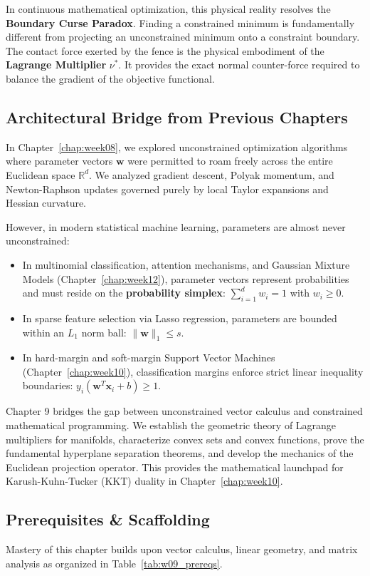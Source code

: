 In continuous mathematical optimization, this physical reality resolves the \textbf{Boundary Curse Paradox}. Finding a constrained minimum is fundamentally different from projecting an unconstrained minimum onto a constraint boundary. The contact force exerted by the fence is the physical embodiment of the \textbf{Lagrange Multiplier} $\nu^*$. It provides the exact normal counter-force required to balance the gradient of the objective functional.

\subsection{Architectural Bridge from Previous Chapters}
In Chapter~\ref{chap:week08}, we explored unconstrained optimization algorithms where parameter vectors $\mathbf{w}$ were permitted to roam freely across the entire Euclidean space $\mathbb{R}^d$. We analyzed gradient descent, Polyak momentum, and Newton-Raphson updates governed purely by local Taylor expansions and Hessian curvature.

However, in modern statistical machine learning, parameters are almost never unconstrained:
\begin{itemize}
    \item In multinomial classification, attention mechanisms, and Gaussian Mixture Models (Chapter~\ref{chap:week12}), parameter vectors represent probabilities and must reside on the \textbf{probability simplex}: $\sum_{i=1}^d w_i = 1$ with $w_i \ge 0$.
    \item In sparse feature selection via Lasso regression, parameters are bounded within an $L_1$ norm ball: $\|\mathbf{w}\|_1 \le s$.
    \item In hard-margin and soft-margin Support Vector Machines (Chapter~\ref{chap:week10}), classification margins enforce strict linear inequality boundaries: $y_i(\mathbf{w}^T \mathbf{x}_i + b) \ge 1$.
\end{itemize}
Chapter 9 bridges the gap between unconstrained vector calculus and constrained mathematical programming. We establish the geometric theory of Lagrange multipliers for manifolds, characterize convex sets and convex functions, prove the fundamental hyperplane separation theorems, and develop the mechanics of the Euclidean projection operator. This provides the mathematical launchpad for Karush-Kuhn-Tucker (KKT) duality in Chapter~\ref{chap:week10}.

\subsection{Prerequisites \& Scaffolding}
Mastery of this chapter builds upon vector calculus, linear geometry, and matrix analysis as organized in Table~\ref{tab:w09_prereqs}.

